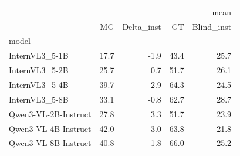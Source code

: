\begin{tabular}{lrrrr}
\toprule
 & \multicolumn{4}{r}{mean} \\
 & MG & Delta_inst & GT & Blind_inst \\
model &  &  &  &  \\
\midrule
InternVL3_5-1B & 17.7 & -1.9 & 43.4 & 25.7 \\
InternVL3_5-2B & 25.7 & 0.7 & 51.7 & 26.1 \\
InternVL3_5-4B & 39.7 & -2.9 & 64.3 & 24.5 \\
InternVL3_5-8B & 33.1 & -0.8 & 62.7 & 28.7 \\
Qwen3-VL-2B-Instruct & 27.8 & 3.3 & 51.7 & 23.9 \\
Qwen3-VL-4B-Instruct & 42.0 & -3.0 & 63.8 & 21.8 \\
Qwen3-VL-8B-Instruct & 40.8 & 1.8 & 66.0 & 25.2 \\
\bottomrule
\end{tabular}
